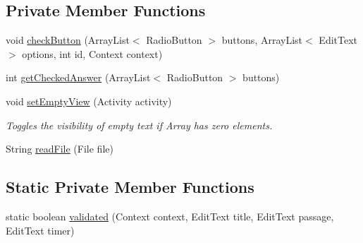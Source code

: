\subsection*{Private Member Functions}
\begin{DoxyCompactItemize}
\item 
void \hyperlink{classorg_1_1buildmlearn_1_1toolkit_1_1templates_1_1ComprehensionTemplate_a11a4912ca4ba41b80aa83da8f93f25a7}{check\+Button} (Array\+List$<$ Radio\+Button $>$ buttons, Array\+List$<$ Edit\+Text $>$ options, int id, Context context)
\item 
int \hyperlink{classorg_1_1buildmlearn_1_1toolkit_1_1templates_1_1ComprehensionTemplate_a5adb3f68caf3c592c00196c396c9308c}{get\+Checked\+Answer} (Array\+List$<$ Radio\+Button $>$ buttons)
\item 
void \hyperlink{classorg_1_1buildmlearn_1_1toolkit_1_1templates_1_1ComprehensionTemplate_aa7f4c850dc90f0b8e32f4f6148e6c8eb}{set\+Empty\+View} (Activity activity)
\begin{DoxyCompactList}\small\item\em Toggles the visibility of empty text if Array has zero elements. \end{DoxyCompactList}\item 
String \hyperlink{classorg_1_1buildmlearn_1_1toolkit_1_1templates_1_1ComprehensionTemplate_af306aec34bc4c2b70b44fc494fc288f2}{read\+File} (File file)
\end{DoxyCompactItemize}
\subsection*{Static Private Member Functions}
\begin{DoxyCompactItemize}
\item 
static boolean \hyperlink{classorg_1_1buildmlearn_1_1toolkit_1_1templates_1_1ComprehensionTemplate_aab8f365bccdd2d749189981b4749cd67}{validated} (Context context, Edit\+Text title, Edit\+Text passage, Edit\+Text timer)
\end{DoxyCompactItemize}

